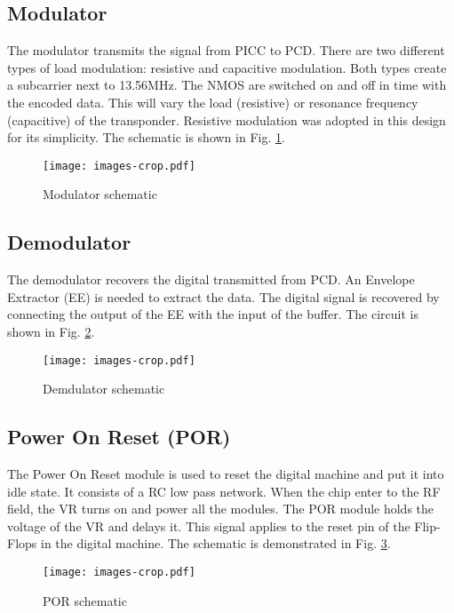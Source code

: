 \subsection{Modulator}

The modulator \cite{rfid_modulador} transmits the signal from PICC to PCD. There are two different types of load modulation: resistive and capacitive modulation. Both types create a subcarrier next to 13.56MHz. The NMOS are switched on and off in time with the encoded data. This will vary the load (resistive) or resonance frequency  (capacitive) of the transponder.  Resistive modulation was adopted in this design for its simplicity. The schematic is shown in Fig. \ref{fig:mod}.

\begin{figure}[h]
  \centering
  \texttt{[image: images-crop.pdf]}
  \caption{Modulator schematic}
  \label{fig:mod}
\end{figure}

\subsection{Demodulator}

The demodulator recovers the digital transmitted from PCD. An Envelope Extractor (EE) \cite{rfid_demodulador} is needed to extract the data. The digital signal is recovered by connecting the output of the EE with the input of the buffer. The circuit is shown in Fig. \ref{fig:demod}. 

\begin{figure}[h]
  \centering
  \texttt{[image: images-crop.pdf]}
  \caption{Demdulator schematic}
  \label{fig:demod}
\end{figure}

\subsection{Power On Reset (POR)}

The Power On Reset module is used to reset the digital machine and put it into idle state. It consists of a RC low pass network. When the chip enter to the RF field, the VR turns on and power all the modules. The POR module holds the voltage of the VR and delays it. This signal applies to the reset pin of the Flip-Flops in the digital machine. The schematic is demonstrated in Fig. \ref{fig:por}. 

\begin{figure}[h]
  \centering
  \texttt{[image: images-crop.pdf]}
  \caption{POR schematic}
  \label{fig:por}
\end{figure}